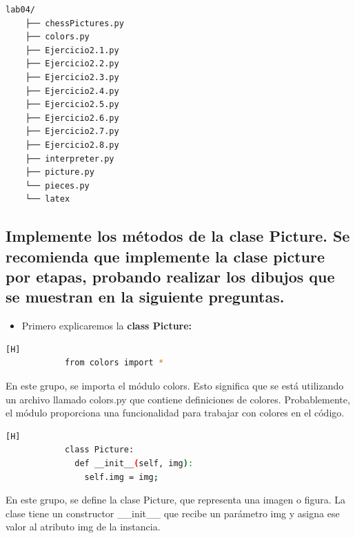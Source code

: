\documentclass{article}
\begin{document}
\begin{lstlisting}[style=ascii-tree]
lab04/
    ├── chessPictures.py
    ├── colors.py
    ├── Ejercicio2.1.py
    ├── Ejercicio2.2.py
    ├── Ejercicio2.3.py
    ├── Ejercicio2.4.py
    ├── Ejercicio2.5.py
    ├── Ejercicio2.6.py
    ├── Ejercicio2.7.py
    ├── Ejercicio2.8.py
    ├── interpreter.py
    ├── picture.py
    └── pieces.py
    └── latex

\end{lstlisting}  
 
	\subsection{Implemente los métodos de la clase Picture. Se recomienda que implemente la clase picture por etapas, probando realizar los dibujos que se muestran en la siguiente preguntas.}
 
        \begin{itemize}	
		\item Primero explicaremos la \textbf{class Picture:} 
	\end{itemize}
 
	\begin{lstlisting}[language=bash,caption={Importación de módulos}][H]
            from colors import *
	\end{lstlisting}
        En este grupo, se importa el módulo colors. Esto significa que se está utilizando un archivo llamado colors.py que contiene definiciones de colores. Probablemente, el módulo proporciona una funcionalidad para trabajar con colores en el código.
                  
	\begin{lstlisting}[language=bash,caption={Definición de la clase Picture}][H]
            class Picture:
              def __init__(self, img):
                self.img = img;
	\end{lstlisting}
En este grupo, se define la clase Picture, que representa una imagen o figura. La clase tiene un constructor \_\_init\_\_ que recibe un parámetro img y asigna ese valor al atributo img de la instancia.
\end{document}
